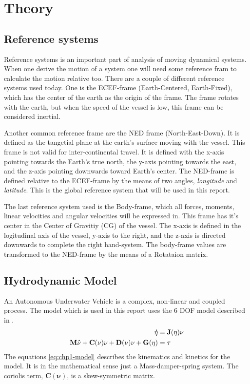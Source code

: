 \chapter{Theory}
	
\section{Reference systems}
	Reference systems is an important part of analysis of moving dynamical systems. When one derive the motion of a system one will need some reference fram to calculate the motion relative too. There are a couple of different reference systems used today. One is the ECEF-frame (Earth-Centered, Earth-Fixed), which has the center of the earth as the origin of the frame. The frame rotates with the earth, but when the speed of the vessel is low, this frame can be considered inertial. \cite{forsell}
	
	Another common reference frame are the NED frame (North-East-Down). It is defined as the tangetial plane at the earth's surface moving with the vessel. This frame is not valid for inter-continental travel. It is defined with the x-axis pointing towards the Earth's true north, the y-axis pointing towards the east, and the z-axis pointing downwards toward Earth's center. The NED-frame is defined relative to the ECEF-frame by the means of two angles, \textit{longitude} and \textit{latitude}. This is the global reference system that will be used in this report. \cite{fossen}
	
	The last reference system used is the Body-frame, which all forces, moments, linear velocities and angular velocities will be expressed in. This frame has it's center in the Center of Gravitiy (CG) of the vessel. The x-axis is defined in the logitudinal axis of the vessel, y-axis to the right, and the z-axis is directed downwards to complete the right hand-system. The body-frame values are transformed to the NED-frame by the means of a Rotataion matrix.
	
	
	
	

\section{Hydrodynamic Model}
	An Autonomous Underwater Vehicle is a complex, non-linear and coupled process. The model which is used in this report uses the 6 DOF model described in \cite{fossen}.
		\begin{align}
			\label{eq:chp1-model}
			\mathbf{\dot{\eta}} &= \mathbf{J}(\mathbf{\eta}) \mathbf{\nu} \\
			\mathbf{M}\mathbf{\dot{\nu}} + \mathbf{C}(\mathbf{\nu})\mathbf{\nu} + \mathbf{D}(\mathbf{\nu})\mathbf{\nu} + \mathbf{G}(\mathbf{\eta}) &= \mathbf{\tau} \\
		\end{align}
	The equations \eqref{eq:chp1-model} describes the kinematics and kinetics for the model. It is in the mathematical sense just a Mass-damper-spring system. The coriolis term, $\mathbf{C}(\mathbf{\nu})$, is a skew-symmetric matrix.
	
